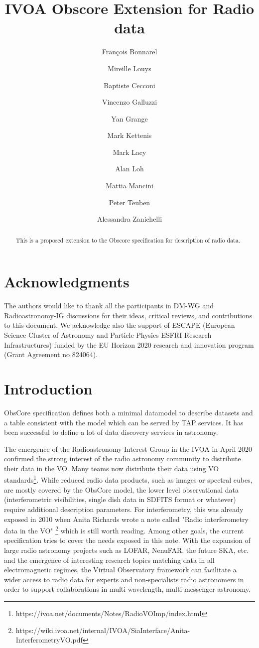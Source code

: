 \documentclass[11pt,a4paper]{ivoa}
\title{IVOA Obscore Extension for Radio data}
\author{Fran\c cois Bonnarel}
\author{Mireille Louys}
\author{Baptiste Cecconi}
\author{Vincenzo Galluzzi}
\author{Yan Grange}
\author{Mark Kettenis}
\author{Mark Lacy}
\author{Alan Loh}
\author{Mattia Mancini}
\author{Peter Teuben}
\author{Alessandra Zanichelli}
\begin{document}
\begin{abstract}
This is a proposed extension to the Obscore specification for description of radio data.
\end{abstract}

\section*{Acknowledgments}

The authors would like to thank all the participants in DM-WG and Radioastronomy-IG discussions 
for their ideas, critical reviews, and contributions to this document.
We acknowledge also the support of  ESCAPE (European Science Cluster of Astronomy
and Particle Physics ESFRI Research Infrastructures) funded by the EU Horizon
2020 research and innovation program (Grant Agreement no 824064).

\section{Introduction}


ObsCore specification \citep{std:OBSCORE} defines both a minimal datamodel to describe datasets 
and a table consistent with the model which can be served by TAP services. It has been successful 
to define a lot of data discovery services in astronomy.

The emergence  of  the Radioastronomy Interest Group in the IVOA in April 2020 confirmed the strong 
interest of the radio astronomy community to distribute their data in the VO. Many teams now 
distribute their data using VO standards\footnote{https://ivoa.net/documents/Notes/RadioVOImp/index.html}. 
While reduced radio data products, such as images or spectral cubes, %
are mostly covered by the ObsCore model, the lower level observational data 
(interferometric visibilities, single dish data in SDFITS format or whatever) require additional description parameters. For interferometry, this was already exposed 
in 2010 when Anita Richards wrote a note called "Radio interferometry data in the VO" 
\footnote{https://wiki.ivoa.net/internal/IVOA/SiaInterface/Anita-InterferometryVO.pdf} which is 
still worth reading. Among other goals, the current specification tries to cover the needs exposed in this note. 
With the expansion of large radio astronomy projects such as LOFAR, NenuFAR, the future SKA, etc. 
and the emergence of interesting research topics matching data in all electromagnetic regimes, the 
Virtual Observatory framework can facilitate a wider access to radio data for experts and 
non-specialists radio astronomers in order to support collaborations in multi-wavelength, 
multi-messenger astronomy. 
\end{document}
